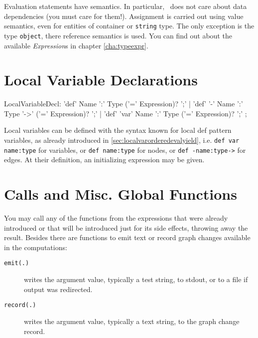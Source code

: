 Evaluation statements have  semantics.
In particular, \GrG\ does not care about data dependencies (you must care for them!).
Assignment is carried out using value semantics, even for entities of container or \texttt{string} type.
The only exception is the type \texttt{object}, there reference semantics is used.
You can find out about the available \emph{Expression}s in chapter \ref{cha:typeexpr}.


\section{Local Variable Declarations} 

\begin{rail} 
  LocalVariableDecl: 
	'def' Name ':' Type ('=' Expression)? ';' |
	'def' '-' Name ':' Type '->' ('=' Expression)? ';' |
	'def' 'var' Name ':' Type ('=' Expression)? ';'
	;
\end{rail}

Local variables can be defined with the syntax known for local def pattern variables, as already introduced in \ref{sec:localvarorderedevalyield}, i.e. \texttt{def var name:type} for variables, or \texttt{def name:type} for nodes, or \texttt{def -name:type->} for edges.
At their definition, an initializing expression may be given.

\section{Calls and Misc. Global Functions} 

You may call any of the functions from the expressions that were already introduced or that will be introduced just for its side effects, throwing away the result.
Besides there are functions to emit text or record graph changes available in the computations: 

\begin{description}
\item[\texttt{emit(.)}] writes the argument value, typically a test string, to stdout, or to a file if output was redirected. 
\item[\texttt{record(.)}] writes the argument value, typically a text string, to the graph change record.
\end{description}

